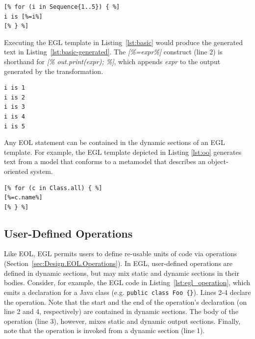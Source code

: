 \begin{lstlisting}[basicstyle=\ttfamily\footnotesize, language=EGL, tabsize=2, flexiblecolumns=true, caption=A basic EGL template., label=lst:basic]
[% for (i in Sequence{1..5}) { %]
i is [%=i%]
[% } %]
\end{lstlisting}

Executing the EGL template in Listing~\ref{lst:basic} would produce the generated
text in Listing~\ref{lst:basic-generated}. The \emph{[\%=expr\%]} construct (line 2) is shorthand for \emph{[\%
  out.print(expr); \%]}, which appends \emph{expr} to the output
generated by the transformation.

\begin{lstlisting}[basicstyle=\ttfamily\footnotesize, language=EGL, tabsize=2, flexiblecolumns=true, caption=The text generated from the basic EGL template (Listing~\ref{lst:basic})., label=lst:basic-generated]
i is 1
i is 2
i is 3
i is 4
i is 5
\end{lstlisting}

Any EOL statement can be contained in the dynamic sections of an EGL template.
For example, the EGL template depicted in Listing \ref{lst:oo} generates text
from a model that conforms to a metamodel that describes an
object-oriented system. %

\begin{lstlisting}[basicstyle=\ttfamily\footnotesize, language=EGL, tabsize=2, flexiblecolumns=true, caption=Generating the name of each Class contained in an input model., label=lst:oo]
[% for (c in Class.all) { %]
[%=c.name%]
[% } %]
\end{lstlisting}

\subsection{User-Defined Operations}
Like EOL, EGL permits users to define re-usable units of code via operations (Section~\ref{sec:Design.EOL.Operations}). In EGL, user-defined operations  
are defined in dynamic sections, but may mix static and dynamic sections in their
bodies. Consider, for example, the EGL code in Listing~\ref{lst:egl_operation}, 
which emits a declaration for a Java class (e.g. \texttt{public class Foo \{\}}).
Lines 2-4 declare the operation. Note that the start and the end of the operation's 
declaration (on line 2 and 4, respectively) are contained in dynamic sections. The
body of the operation (line 3), however, mixes static and dynamic output sections.
Finally, note that the operation is invoked from a dynamic section (line 1).

